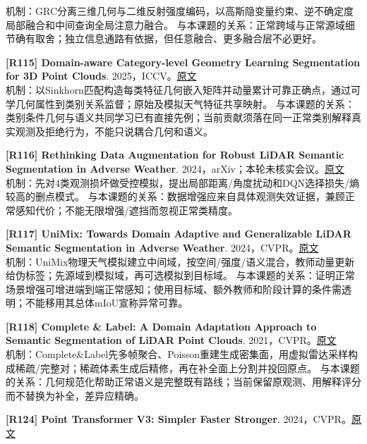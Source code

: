 \documentclass[11pt,a4paper]{article}
\begin{document}
机制：GRC分离三维几何与二维反射强度编码，以高斯隐变量约束、逆不确定度局部融合和中间查询全局注意力融合。 与本课题的关系：正常跨域与正常源域细节确有取舍；独立信息通路有依据，但任意融合、更多融合层不必更好。\par\medskip
\hypertarget{R115}{}\textbf{[R115] Domain-aware Category-level Geometry Learning Segmentation for 3D Point Clouds}. 2025，ICCV。\href{https://openaccess.thecvf.com/content/ICCV2025/papers/He_Domain-aware_Category-level_Geometry_Learning_Segmentation_for_3D_Point_Clouds_ICCV_2025_paper.pdf}{原文}\\
机制：以Sinkhorn匹配构造每类特征几何嵌入矩阵并动量累计可靠正确点，通过可学几何属性到类别关系监督；原始及模拟天气特征共享映射。 与本课题的关系：类别条件几何与语义共同学习已有直接先例；当前贡献须落在同一正常类别解释真实观测及拒绝行为，不能只说耦合几何和语义。\par\medskip
\hypertarget{R116}{}\textbf{[R116] Rethinking Data Augmentation for Robust LiDAR Semantic Segmentation in Adverse Weather}. 2024，arXiv；本轮未核实会议。\href{https://arxiv.org/pdf/2407.02286}{原文}\\
机制：先对4类观测损坏做受控模拟，提出局部距离/角度扰动和DQN选择损失/熵较高的删点模式。 与本课题的关系：数据增强应来自具体观测失效证据，兼顾正常感知代价；不能无限增强/遮挡而忽视正常类精度。\par\medskip
\hypertarget{R117}{}\textbf{[R117] UniMix: Towards Domain Adaptive and Generalizable LiDAR Semantic Segmentation in Adverse Weather}. 2024，CVPR。\href{https://arxiv.org/pdf/2404.05145}{原文}\\
机制：UniMix物理天气模拟建立中间域，按空间/强度/语义混合，教师动量更新给伪标签；先源域到模拟域，再可选模拟到目标域。 与本课题的关系：证明正常场景增强可增进端到端正常感知；使用目标域、额外教师和阶段计算的条件需透明；不能移用其总体mIoU宣称异常可靠。\par\medskip
\hypertarget{R118}{}\textbf{[R118] Complete \& Label: A Domain Adaptation Approach to Semantic Segmentation of LiDAR Point Clouds}. 2021，CVPR。\href{https://arxiv.org/pdf/2007.08488}{原文}\\
机制：Complete\&Label先多帧聚合、Poisson重建生成密集面，用虚拟雷达采样构成稀疏/完整对；稀疏体素生成后精修，再在补全面上分割并投回原点。 与本课题的关系：几何规范化帮助正常语义是完整既有路线；当前保留原观测、用解释评分而不替换为补全，差异应精确。\par\medskip
\hypertarget{R124}{}\textbf{[R124] Point Transformer V3: Simpler Faster Stronger}. 2024，CVPR。\href{https://openaccess.thecvf.com/content/CVPR2024/papers/Wu_Point_Transformer_V3_Simpler_Faster_Stronger_CVPR_2024_paper.pdf}{原文}\\
\end{document}
